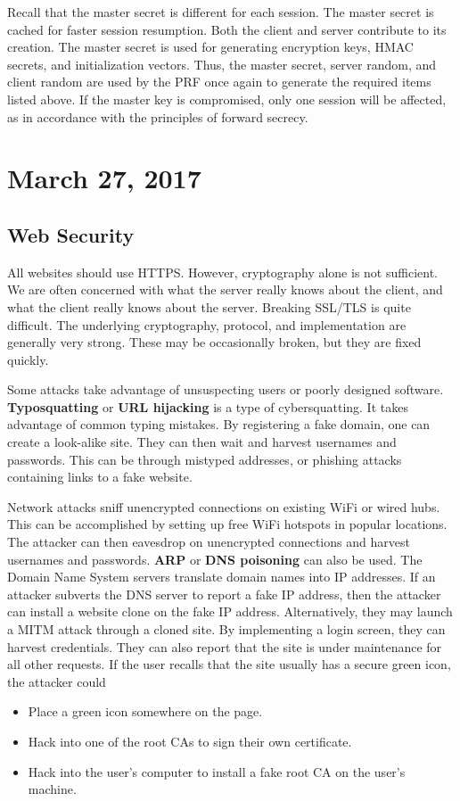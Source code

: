 \documentclass[11pt]{article}
\theoremstyle{plain} %
\theoremstyle{definition}
\theoremstyle{example}
\theoremstyle{remark}
\begin{document}
Recall that the master secret is different for each session. The master secret is cached for faster session resumption. Both the client and server contribute to its creation. The master secret is used for generating encryption keys, HMAC secrets, and initialization vectors. Thus, the master secret, server random, and client random are used by the PRF once again to generate the required items listed above. If the master key is compromised, only one session will be affected, as in accordance with the principles of forward secrecy. 

\section{March 27, 2017}
\subsection{Web Security}

All websites should use HTTPS. However, cryptography alone is not sufficient. We are often concerned with what the server really knows about the client, and what the client really knows about the server. Breaking SSL/TLS is quite difficult. The underlying cryptography, protocol, and implementation are generally very strong. These may be occasionally broken, but they are fixed quickly. 

Some attacks take advantage of unsuspecting users or poorly designed software. \textbf{Typosquatting} or \textbf{URL hijacking} is a type of cybersquatting. It takes advantage of common typing mistakes. By registering a fake domain, one can create a look-alike site. They can then wait and harvest usernames and passwords. This can be through mistyped addresses, or phishing attacks containing links to a fake website. 

Network attacks sniff unencrypted connections on existing WiFi or wired hubs. This can be accomplished by setting up free WiFi hotspots in popular locations. The attacker can then eavesdrop on unencrypted connections and harvest usernames and passwords. \textbf{ARP} or \textbf{DNS poisoning} can also be used. The Domain Name System servers translate domain names into IP addresses. If an attacker subverts the DNS server to report a fake IP address, then the attacker can install a website clone on the fake IP address. Alternatively, they may launch a MITM attack through a cloned site. By implementing a login screen, they can harvest credentials. They can also report that the site is under maintenance for all other requests. If the user recalls that the site usually has a secure green icon, the attacker could 
\begin{itemize}
	\item Place a green icon somewhere on the page.
	\item Hack into one of the root CAs to sign their own certificate.
	\item Hack into the user's computer to install a fake root CA on the user's machine.
\end{itemize}
\end{document}
